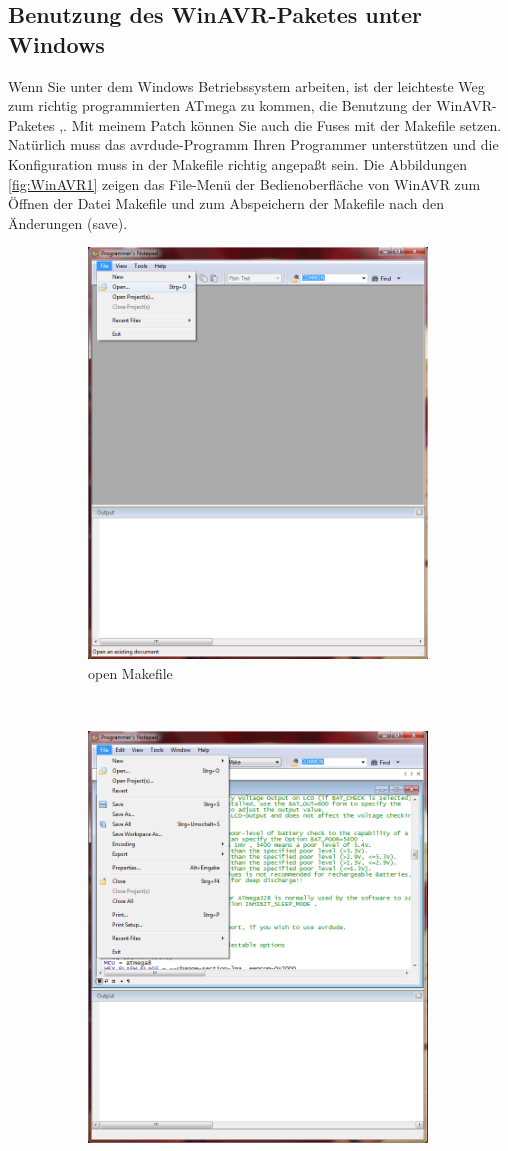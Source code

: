 \subsection{Benutzung des WinAVR-Paketes unter Windows}
Wenn Sie unter dem Windows Betriebssystem arbeiten, ist der leichteste Weg zum
richtig programmierten ATmega zu kommen, die Benutzung der WinAVR-Paketes \cite{winavr1},\cite{winavr2}.
Mit meinem Patch \cite{winavr3} können Sie auch die Fuses mit der Makefile setzen.
Natürlich muss das avrdude-Programm Ihren Programmer unterstützen und die Konfiguration muss in
der Makefile richtig angepaßt sein.
Die Abbildungen \ref{fig:WinAVR1} zeigen das File-Menü der Bedienoberfläche von WinAVR zum
Öffnen der Datei Makefile und zum Abspeichern der Makefile nach den Änderungen (save).

\begin{figure}[H]
  \begin{subfigure}[b]{9cm}
    \centering
    \includegraphics[width=9cm]{../PNG/Notepad_open.png}
    \caption{open Makefile}
  \end{subfigure}
  ~
  \begin{subfigure}[b]{9cm}
    \centering
    \includegraphics[width=9cm]{../PNG/Notepad_save.png}

\end{subfigure}
\end{figure}
